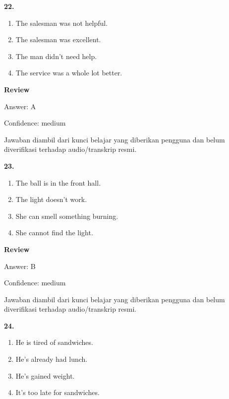\documentclass[12pt]{article}
\begin{document}
\noindent\textbf{22.}
\begin{enumerate}[label=(\Alph*),leftmargin=*,itemsep=0.2em]
\item The salesman was not helpful.
\item The salesman was excellent.
\item The man didn't need help.
\item The service was a whole lot better.
\end{enumerate}
\par
\begingroup
\setlength{\parskip}{0pt}
\setlength{\parindent}{0pt}
\textbf{Review}\par
Answer: A\par
Confidence: medium\par
Jawaban diambil dari kunci belajar yang diberikan pengguna dan belum diverifikasi terhadap audio/transkrip resmi.\par
\endgroup
\par
\vspace{0.25\baselineskip}
\noindent\textbf{23.}
\begin{enumerate}[label=(\Alph*),leftmargin=*,itemsep=0.2em]
\item The ball is in the front hall.
\item The light doesn't work.
\item She can smell something burning.
\item She cannot find the light.
\end{enumerate}
\par
\begingroup
\setlength{\parskip}{0pt}
\setlength{\parindent}{0pt}
\textbf{Review}\par
Answer: B\par
Confidence: medium\par
Jawaban diambil dari kunci belajar yang diberikan pengguna dan belum diverifikasi terhadap audio/transkrip resmi.\par
\endgroup
\par
\vspace{0.25\baselineskip}
\noindent\textbf{24.}
\begin{enumerate}[label=(\Alph*),leftmargin=*,itemsep=0.2em]
\item He is tired of sandwiches.
\item He's already had lunch.
\item He's gained weight.
\item It's too late for sandwiches.
\end{enumerate}
\par
\end{document}
